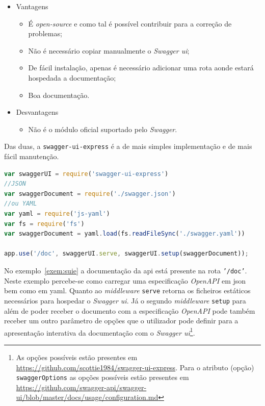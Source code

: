 \begin{itemize}
\begin{itemize}
        \item Vantagens
        \begin{itemize}
            \item É \textit{open-source} e como tal é possível contribuir para a correção de problemas;
            \item Não é necessário copiar manualmente o \textit{Swagger \acrshort{ui}};
            \item De fácil instalação, apenas é necessário adicionar uma rota aonde estará hospedada a documentação;
            \item Boa documentação.
        \end{itemize}
        \item Desvantagens
        \begin{itemize}
            \item Não é o módulo oficial suportado pelo \textit{Swagger}.
        \end{itemize}
    \end{itemize}
\end{itemize}

Das duas, a \texttt{swagger-ui-express} é a de mais simples implementação e de mais fácil manutenção.

\begin{lstlisting}[language=javascript, caption=Exemplo de uso do \texttt{swagger-ui-express}, label=exem:suie]
var swaggerUI = require('swagger-ui-express')
//JSON
var swaggerDocument = require('./swagger.json')
//ou YAML
var yaml = require('js-yaml')
var fs = require('fs')
var swaggerDocument = yaml.load(fs.readFileSync('./swagger.yaml'))

app.use('/doc', swaggerUI.serve, swaggerUI.setup(swaggerDocument));
\end{lstlisting}

No exemplo~\ref{exem:suie} a documentação da \acrshort{api} está presente na rota \texttt{'/doc'}. 
Neste exemplo percebe-se como carregar uma especificação \textit{OpenAPI} em \acrshort{json} bem como 
em \acrshort{yaml}. Quanto ao \textit{middleware} \texttt{serve} retorna os ficheiros estáticos necessários 
para hospedar o \textit{Swagger \acrshort{ui}}. Já o segundo \textit{middleware} \texttt{setup} para além de 
poder receber o documento com a especificação \textit{OpenAPI} pode também receber um outro parâmetro de opções 
que o utilizador pode definir para a apresentação interativa da documentação com o 
\textit{Swagger \acrshort{ui}}\footnote{As opções possíveis estão presentes em \url{https://github.com/scottie1984/swagger-ui-express}. Para o atributo (opção) \texttt{swaggerOptions} as opções possíveis estão presentes em \url{https://github.com/swagger-api/swagger-ui/blob/master/docs/usage/configuration.md}}.

